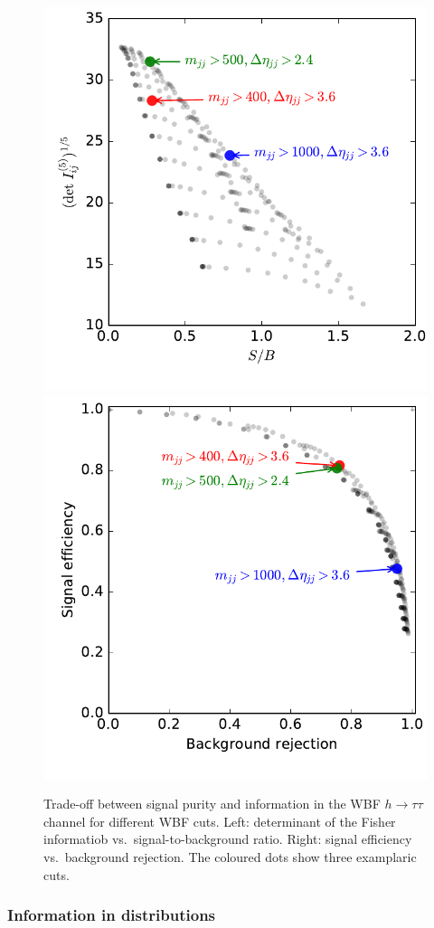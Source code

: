 \begin{figure}
  \includegraphics[height=0.45 \textwidth]{fig/information/wbf_tautau_tunecuts_purity_vs_information}%
  \includegraphics[height=0.45 \textwidth]{fig/information/wbf_tautau_tunecuts_roc}%
  \caption{Trade-off between signal purity and information in the WBF
    $h \to \tau \tau$ channel for different WBF cuts. Left:
    determinant of the Fisher informatiob vs.\ signal-to-background
    ratio. Right: signal efficiency vs.\ background rejection. The
    coloured dots show three examplaric cuts.}
  \label{fig:information_wbf_tautau_cut_roc}
\end{figure}



\subsubsection{Information in distributions}

